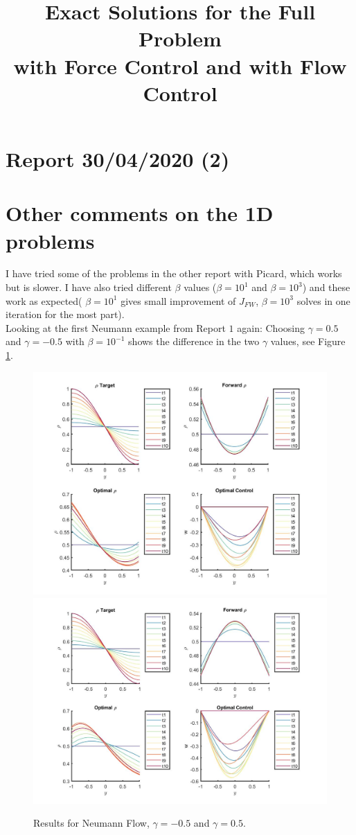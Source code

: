 \documentclass[11pt, a4paper]{article}
\title{Exact Solutions for the Full Problem \\with Force Control and with Flow Control}
\date{}
\theoremstyle{definition}
\begin{document}
	
\section*{Report 30/04/2020 (2)}

\section{Other comments on the 1D problems}
I have tried some of the problems in the other report with Picard, which works but is slower. I have also tried different $\beta$ values ($\beta = 10^{1}$ and $\beta = 10^3$) and these work as expected( $\beta = 10^{1}$ gives small improvement of $J_{FW}$, $\beta = 10^3$ solves in one iteration for the most part).\\
Looking at the first Neumann example from Report $1$ again:
Choosing $\gamma = 0.5$ and $\gamma =-0.5$ with $\beta = 10^{-1}$ shows the difference in the two $\gamma$ values, see Figure \ref{Res22}. 
\begin{figure}[h]
	\includegraphics[scale=0.3]{Res21.jpg}
	\includegraphics[scale=0.3]{Res22.jpg}
	\caption{Results for Neumann Flow, $\gamma = -0.5$ and $\gamma =0.5$.}
	\label{Res22}
\end{figure}
\end{document}
